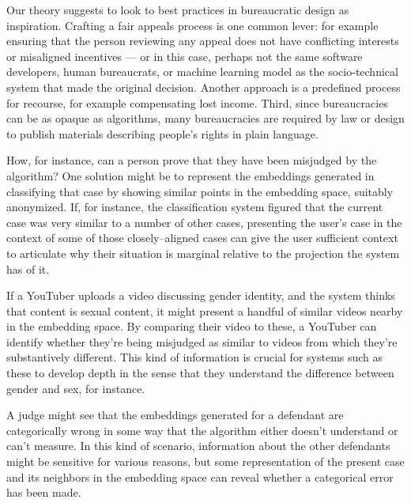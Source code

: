 \documentclass[street-level_algorithms]{subfiles}
\begin{document}
Our theory suggests to look to best practices in bureaucratic design as inspiration.
Crafting a fair appeals process is one common lever: for example ensuring that
the person reviewing any appeal does not have conflicting interests or misaligned incentives
--- or in this case, perhaps not the same software developers, human bureaucrats, or machine learning model as the socio-technical system that made the original decision.
Another approach is a predefined process for recourse, for example compensating lost income.
Third, since bureaucracies can be as opaque as algorithms,
many bureaucracies are required by law or design to publish materials describing people’s rights in plain language.

How, for instance, can a person prove that they have been misjudged by the algorithm?
One solution might be to represent the embeddings generated in classifying that case by showing similar points in the embedding space, suitably anonymized.
If, for instance,
the classification system figured that the current case was very similar to a number of other cases,
presenting the user's case in the context of some of those closely--aligned cases
can give the user sufficient context to articulate why their situation is marginal relative to the projection the system has of it.

If a YouTuber uploads a video discussing gender identity, and
the system thinks that content is sexual content,
it might present a handful of similar videos nearby in the embedding space.
By comparing their video to these,
a YouTuber can identify whether they're being misjudged as similar to videos from which they're substantively different.
This kind of information is crucial for systems such as these to develop depth
in the sense that they understand the difference between gender and sex, for instance.

A judge might see that the embeddings generated for a defendant are
categorically wrong in some way that the algorithm either doesn't understand or can't measure.
In this kind of scenario,
information about the other defendants might be sensitive for various reasons, but
some representation of the present case and its neighbors in the embedding space can
reveal whether a categorical error has been made.
\end{document}
